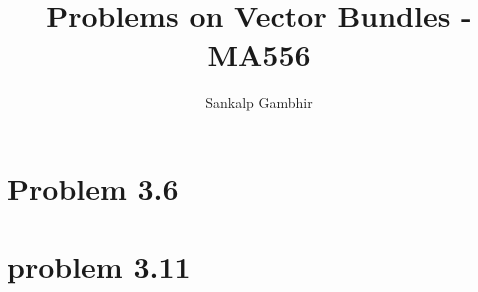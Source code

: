 \documentclass[aspectratio=169]{beamer}
\title{Problems on Vector Bundles - MA556}
\author{
    Sankalp Gambhir
}
\begin{document}
    \frame{\titlepage}

    \section{Problem 3.6}
    

    \section{problem 3.11}
    
\end{document}
